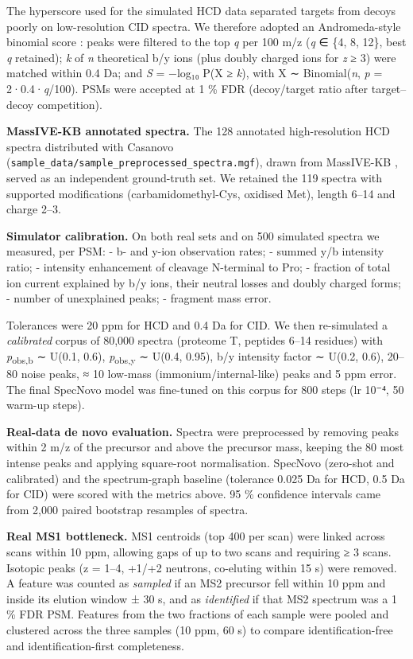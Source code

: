 \documentclass{sn-preview}
\begin{document}
The hyperscore used for the simulated HCD data separated targets from decoys poorly on low-resolution CID spectra. We therefore adopted an Andromeda-style binomial score \cite{cox2011}: peaks were filtered to the top \emph{q} per 100 m/z (\emph{q} ∈ \{4, 8, 12\}, best \emph{q} retained); \emph{k} of \emph{n} theoretical b/y ions (plus doubly charged ions for \emph{z} ≥ 3) were matched within 0.4 Da; and \emph{S} = −log₁₀ P(X ≥ \emph{k}), with X ∼ Binomial(\emph{n}, \emph{p} = 2·0.4·\emph{q}/100). PSMs were accepted at 1 \% FDR (decoy/target ratio after target--decoy competition).

\textbf{MassIVE-KB annotated spectra.} The 128 annotated high-resolution HCD spectra distributed with Casanovo \cite{yilmaz2024} (\texttt{sample\_data/sample\_preprocessed\_spectra.mgf}), drawn from MassIVE-KB \cite{wang2018}, served as an independent ground-truth set. We retained the 119 spectra with supported modifications (carbamidomethyl-Cys, oxidised Met), length 6--14 and charge 2--3.

\textbf{Simulator calibration.} On both real sets and on 500 simulated spectra we measured, per PSM: - b- and y-ion observation rates; - summed y/b intensity ratio; - intensity enhancement of cleavage N-terminal to Pro; - fraction of total ion current explained by b/y ions, their neutral losses and doubly charged forms; - number of unexplained peaks; - fragment mass error.

Tolerances were 20 ppm for HCD and 0.4 Da for CID. We then re-simulated a \emph{calibrated} corpus of 80,000 spectra (proteome T, peptides 6--14 residues) with \emph{p}\textsubscript{obs,b} ∼ U(0.1, 0.6), \emph{p}\textsubscript{obs,y} ∼ U(0.4, 0.95), b/y intensity factor ∼ U(0.2, 0.6), 20--80 noise peaks, ≈ 10 low-mass (immonium/internal-like) peaks and 5 ppm error. The final SpecNovo model was fine-tuned on this corpus for 800 steps (lr 10⁻⁴, 50 warm-up steps).

\textbf{Real-data de novo evaluation.} Spectra were preprocessed by removing peaks within 2 m/z of the precursor and above the precursor mass, keeping the 80 most intense peaks and applying square-root normalisation. SpecNovo (zero-shot and calibrated) and the spectrum-graph baseline (tolerance 0.025 Da for HCD, 0.5 Da for CID) were scored with the metrics above. 95 \% confidence intervals came from 2,000 paired bootstrap resamples of spectra.

\textbf{Real MS1 bottleneck.} MS1 centroids (top 400 per scan) were linked across scans within 10 ppm, allowing gaps of up to two scans and requiring ≥ 3 scans. Isotopic peaks (z = 1--4, +1/+2 neutrons, co-eluting within 15 s) were removed. A feature was counted as \emph{sampled} if an MS2 precursor fell within 10 ppm and inside its elution window ± 30 s, and as \emph{identified} if that MS2 spectrum was a 1 \% FDR PSM. Features from the two fractions of each sample were pooled and clustered across the three samples (10 ppm, 60 s) to compare identification-free and identification-first completeness.
\end{document}
